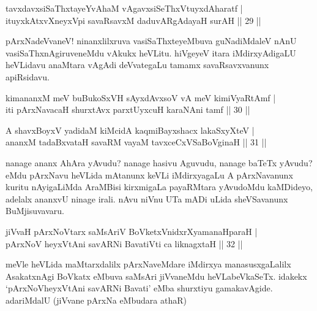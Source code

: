 \begin{shl}
tavxdavxsiSaThxtayeYvAhaM vAgavxsiSeThxVtuyxdAharatf | \\
ituyxkAtxvX\s neyxV\s pi savaRsavxM daduvARgAdayaH surAH \hfill|| 29 || 
\end{shl}

\begin{artha}
pArxNadeVvaneV! ninanxlilxruva vasiSaThxteyeMbuva guNadiMdaleV nAnU 
vasiSaThx\-nAgiruveneMdu vAkukx heVLitu. hiVgeyeV itara iMdirxyAdigaLU 
heVLidavu anaMtara vAgAdi deVvategaLu tamamx savaRsavxvanunx apiRsidavu.
\end{artha}


\begin{shl}
kimananxM meV buBukoSxVH sAyxdAvxsoV vA meV kimiVyaRtAmf | \\
iti pArxNavacaH shurxtAvx parxtUyxcuH karaNAni tamf \hfill|| 30 || 
\end{shl}

\begin{shl}
A shavxBoyxV yadidaM kiMcidA kaqmiBayxshacx lakaSxyXteV | \\
ananxM tadaBxvataH savaRM vayaM tavxceCxVSaBoVginaH \hfill|| 31 || 
\end{shl}

\begin{artha}
nanage ananx AhAra yAvudu? nanage hasivu Aguvudu, nanage baTeTx 
yAvudu? eMdu pArxNavu heVLida mAtanunx keVLi iMdirxyagaLu A 
pArxNavanunx kuritu nAyigaLiMda AraMBisi kirxmigaLa payaRMtara 
yAvudoMdu kaMDideyo, adelalx ananxvU ninage irali. nAvu niVnu UTa mADi 
uLida sheVSavanunx BuMjisuvavaru.
\end{artha}


\begin{shl}
jiVvaH pArxNoV\s tarx saMsAriV BoVketxVnidxrXyamanaHparaH | \\
\footnotemark[1]pArxNoV heyxVtAni savARNi BavatiVti ca liknagxtaH \hfill|| 32 || 
\end{shl}

\begin{artha}
meVle heVLida maMtarxdalilx pArxNaveMdare iMdirxya manasusxgaLalilx AsakatxnAgi BoVkatx eMbuva saMsAri jiVvaneMdu heVLabeVkaSeTx. idakekx `pArxNoVheyxVtAni savARNi Bavati' eMba shurxtiyu gamakavAgide. adariMdalU (jiVvane pArxNa eMbudara athaR)
\end{artha}

